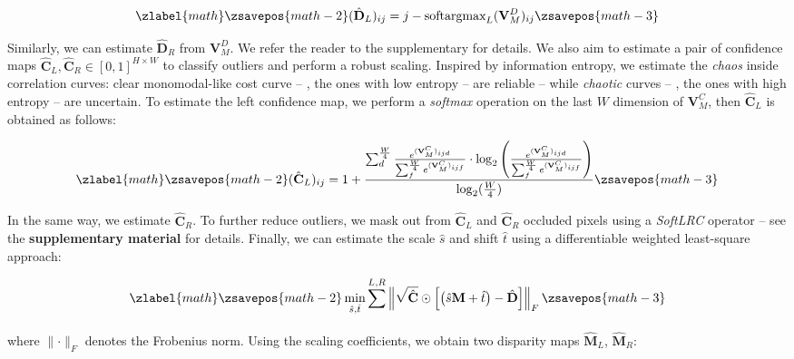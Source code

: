 \documentclass[10pt,twocolumn,letterpaper]{article}
\begin{document}
\begin{equation}
\zlabel{math}
    \zsavepos{math-2}
    (\hat{\mathbf{D}}_L)_{ij} = j - \text{softargmax}_L(\mathbf{V}^D_M)_{ij}
    \label{eq:softmax_left}
    \zsavepos{math-3}\end{equation}


Similarly, we can estimate $\hat{\mathbf{D}}_R$ from $\mathbf{V}^D_M$. We refer the reader to the supplementary for details.
We also aim to estimate a pair of confidence maps $\hat{\mathbf{C}}_L, \hat{\mathbf{C}}_R \in [0,1]^{H \times W}$ to classify outliers and perform a robust scaling.
Inspired by information entropy, we estimate the \textit{chaos} inside correlation curves: clear monomodal-like cost curve -- \ie, the ones with low entropy -- are reliable -- while \textit{chaotic} curves -- \ie, the ones with high entropy -- are uncertain.
To estimate the left confidence map, we perform a \textit{softmax} operation on the last $W$ dimension of $\mathbf{V}^C_M$, then $\hat{\mathbf{C}}_L$ is obtained as follows:


\begin{equation}
\zlabel{math}
    \zsavepos{math-2}
    (\hat{\mathbf{C}}_L)_{ij} = 1  + \frac{\sum_{d}^{\frac{W}{4}} \frac{e^{(\mathbf{V}^C_M)_{ijd}}}{\sum_{f}^{\frac{W}{4}} e^{(\mathbf{V}^C_M)_{ijf}}} \cdot \log_2 \left( \frac{e^{(\mathbf{V}^C_M)_{ijd}}}{\sum_{f}^{\frac{W}{4}} e^{(\mathbf{V}^C_M)_{ijf}}} \right)}{\log_2(\frac{W}{4})}
    \label{eq:confidence_left}
    \zsavepos{math-3}\end{equation}


In the same way, we estimate $\hat{\mathbf{C}}_R$.
To further reduce outliers, we mask out from $\hat{\mathbf{C}}_L$ and $\hat{\mathbf{C}}_R$ occluded pixels using a \textit{SoftLRC} operator -- see the \textbf{supplementary material} for details.
Finally, we can estimate the scale $\hat{s}$ and shift $\hat{t}$ using a differentiable weighted least-square approach:


\begin{equation}
\zlabel{math}
    \zsavepos{math-2}
    \min_{\hat{s}, \hat{t}} \sum_{}^{L,R} \left\lVert \sqrt{\hat{\mathbf{C}}}\odot\left[\left(\hat{s}\mathbf{M} + \hat{t}\right)  - \hat{\mathbf{D}} \right] \right\rVert_F
    \label{eq:scale_shift}
    \zsavepos{math-3}\end{equation}


where $\lVert\cdot\rVert_F$ denotes the Frobenius norm.
Using the scaling coefficients, we obtain two disparity maps $\hat{\mathbf{M}}_L$, $\hat{\mathbf{M}}_R$:
\end{document}
